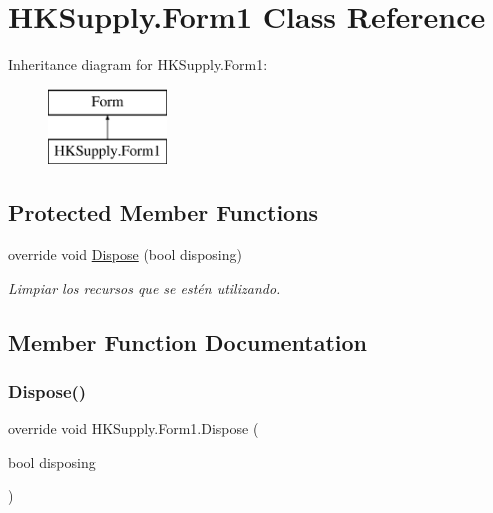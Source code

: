 \hypertarget{class_h_k_supply_1_1_form1}{}\section{H\+K\+Supply.\+Form1 Class Reference}
\label{class_h_k_supply_1_1_form1}
Inheritance diagram for H\+K\+Supply.\+Form1\+:\begin{figure}[H]
\begin{center}
\leavevmode
\includegraphics[height=2.000000cm]{class_h_k_supply_1_1_form1}
\end{center}
\end{figure}
\subsection*{Protected Member Functions}
\begin{DoxyCompactItemize}
\item 
override void \hyperlink{class_h_k_supply_1_1_form1_a406b8a9257d093c285ba546b75e81757}{Dispose} (bool disposing)
\begin{DoxyCompactList}\small\item\em Limpiar los recursos que se estén utilizando. \end{DoxyCompactList}\end{DoxyCompactItemize}


\subsection{Member Function Documentation}
\mbox{\label{class_h_k_supply_1_1_form1_a406b8a9257d093c285ba546b75e81757}} 
\subsubsection{\texorpdfstring{Dispose()}{Dispose()}}
{\footnotesize\ttfamily override void H\+K\+Supply.\+Form1.\+Dispose (\begin{DoxyParamCaption}\item[{bool}]{disposing }\end{DoxyParamCaption})\hspace{0.3cm}{\ttfamily [protected]}}



